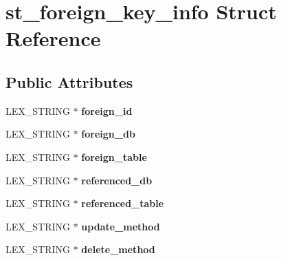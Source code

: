 \hypertarget{structst__foreign__key__info}{}\section{st\+\_\+foreign\+\_\+key\+\_\+info Struct Reference}
\label{structst__foreign__key__info}
\subsection*{Public Attributes}
\begin{DoxyCompactItemize}
\item 
\mbox{\label{structst__foreign__key__info_a672e3360e63e83bd90fd0a91001c0e05}} 
L\+E\+X\+\_\+\+S\+T\+R\+I\+NG $\ast$ {\bfseries foreign\+\_\+id}
\item 
\mbox{\label{structst__foreign__key__info_a09de07e920e0d5d6080fa0c5e99a7fcf}} 
L\+E\+X\+\_\+\+S\+T\+R\+I\+NG $\ast$ {\bfseries foreign\+\_\+db}
\item 
\mbox{\label{structst__foreign__key__info_a6fda6e178cb9a4d6bb81a7525a44f2db}} 
L\+E\+X\+\_\+\+S\+T\+R\+I\+NG $\ast$ {\bfseries foreign\+\_\+table}
\item 
\mbox{\label{structst__foreign__key__info_a651a7ab3419e43e2c330df5bba6cb6d7}} 
L\+E\+X\+\_\+\+S\+T\+R\+I\+NG $\ast$ {\bfseries referenced\+\_\+db}
\item 
\mbox{\label{structst__foreign__key__info_a681caabf130ab3fdcfe5a611af73ac34}} 
L\+E\+X\+\_\+\+S\+T\+R\+I\+NG $\ast$ {\bfseries referenced\+\_\+table}
\item 
\mbox{\label{structst__foreign__key__info_ad4bfd29650469ff21ed2efae747e7af9}} 
L\+E\+X\+\_\+\+S\+T\+R\+I\+NG $\ast$ {\bfseries update\+\_\+method}
\item 
\mbox{\label{structst__foreign__key__info_a9e3e70f24e2e22e0397077eec998e83c}} 
L\+E\+X\+\_\+\+S\+T\+R\+I\+NG $\ast$ {\bfseries delete\+\_\+method}
\item 
\mbox{\label{structst__foreign__key__info_adb991ff4dceb4ae001300fb6b7e1cffa}} 

\end{DoxyCompactItemize}

